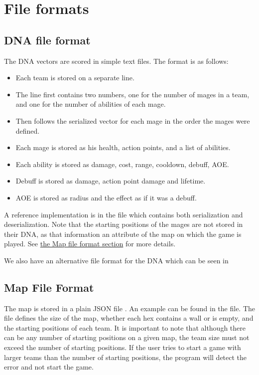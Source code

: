 \chapter{File formats}
\label{file-formats}

\section{DNA file format}
\label{dna-format}

The DNA vectors are scored in simple text files. The format is as follows:

\begin{itemize}
	\item Each team is stored on a separate line.
	\item The line first contains two numbers, one for the number of mages in a team, and one for the number of abilities of each mage.
	\item Then follows the serialized vector for each mage in the order the mages were defined.
	\item Each mage is stored as his health, action points, and a list of abilities.
	\item Each ability is stored as damage, cost, range, cooldown, debuff, AOE.
	\item Debuff is stored as damage, action point damage and lifetime.
	\item AOE is stored as radius and the effect as if it was a debuff.
\end{itemize}

A reference implementation is in the  file which contains both serialization and deserialization. Note that the starting positions of the mages are not stored in their DNA, as that information an attribute of the map on which the game is played. See \hyperref[map-format]{the Map file format section} for more details.

We also have an alternative file format for the DNA which can be seen in

\section{Map File Format}
\label{map-format}

The map is stored in a plain JSON file \citep{json}. An example can be found in the  file. The file defines the size of the map, whether each hex contains a wall or is empty, and the starting positions of each team. It is important to note that although there can be any number of starting positions on a given map, the team size must not exceed the number of starting positions. If the user tries to start a game with larger teams than the number of starting positions, the program will detect the error and not start the game.

